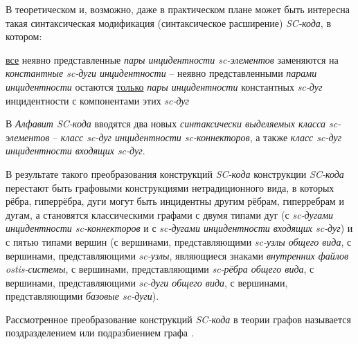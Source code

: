 \begin{SCn}
{В теоретическом и, возможно, даже в практическом плане может быть интересна такая синтаксическая модификация (синтаксическое расширение) \textit{SC-кода}, в котором: 
\begin{scnitemize}
\item \uline{все} неявно представленные \textit{пары инцидентности sc-элементов} заменяются на \textit{константные sc-дуги инцидентности} -- неявно представленными \textit{парами инцидентности} остаются \uline{только} \textit{пары инцидентности} константных \textit{sc-дуг} инцидентности с компонентами этих \textit{sc-дуг}
\item В \textit{Алфавит SC-кода} вводятся два новых \textit{синтаксически выделяемых класса sc-элементов} -- \textit{класс sc-дуг инцидентности sc-коннекторов}, а также \textit{класс sc-дуг инцидентности входящих sc-дуг}.
\end{scnitemize}

В результате такого преобразования конструкций \textit{SC-кода} конструкции \textit{SC-кода} перестают быть графовыми конструкциями нетрадиционного вида, в которых рёбра, гиперрёбра, дуги могут быть инцидентны другим рёбрам, гиперребрам и дугам, а становятся классическими графами с двумя типами дуг (с \textit{sc-дугами инцидентности sc-коннекторов} и с \textit{sc-дугами инцидентности входящих sc-дуг}) и с пятью типами вершин (с вершинами, представляющими \textit{sc-узлы общего вида}, с вершинами, представляющими \textit{sc-узлы}, являющиеся знаками \textit{внутренних файлов ostis-системы}, с вершинами, представляющими \textit{sc-рёбра общего вида}, с вершинами, представляющими \textit{sc-дуги общего вида}, с вершинами, представляющими \textit{базовые sc-дуги}).

Рассмотренное преобразование конструкций \textit{SC-кода} в теории графов называется поздразделением или подразбиением графа .}

\scnendstruct
{}

\scnendstruct
{}



\end{SCn}
